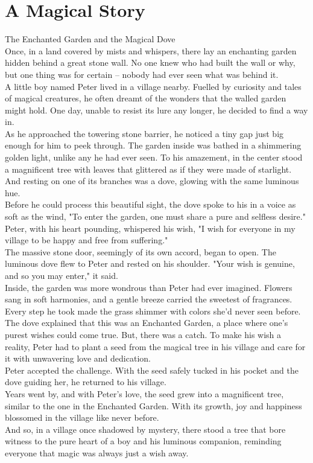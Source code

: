 \documentclass[a4paper,12pt]{article}
\begin{document}
\section{A Magical Story}
The Enchanted Garden and the Magical Dove\\
Once, in a land covered by mists and whispers, there lay an enchanting garden hidden behind a great stone wall. No one knew who had built the wall or why, but one thing was for certain – nobody had ever seen what was behind it.\\
A little boy named Peter lived in a village nearby. Fuelled by curiosity and tales of magical creatures, he often dreamt of the wonders that the walled garden might hold. One day, unable to resist its lure any longer, he decided to find a way in.\\
As he approached the towering stone barrier, he noticed a tiny gap just big enough for him to peek through. The garden inside was bathed in a shimmering golden light, unlike any he had ever seen. To his amazement, in the center stood a magnificent tree with leaves that glittered as if they were made of starlight. And resting on one of its branches was a dove, glowing with the same luminous hue.\\
Before he could process this beautiful sight, the dove spoke to his in a voice as soft as the wind, "To enter the garden, one must share a pure and selfless desire."\\
Peter, with his heart pounding, whispered his wish, "I wish for everyone in my village to be happy and free from suffering."\\
The massive stone door, seemingly of its own accord, began to open. The luminous dove flew to Peter and rested on his shoulder. "Your wish is genuine, and so you may enter," it said.\\
Inside, the garden was more wondrous than Peter had ever imagined. Flowers sang in soft harmonies, and a gentle breeze carried the sweetest of fragrances. Every step he took made the grass shimmer with colors she'd never seen before.\\
The dove explained that this was an Enchanted Garden, a place where one’s purest wishes could come true. But, there was a catch. To make his wish a reality, Peter had to plant a seed from the magical tree in his village and care for it with unwavering love and dedication.\\
Peter accepted the challenge. With the seed safely tucked in his pocket and the dove guiding her, he returned to his village.\\
Years went by, and with Peter's love, the seed grew into a magnificent tree, similar to the one in the Enchanted Garden. With its growth, joy and happiness blossomed in the village like never before.\\
And so, in a village once shadowed by mystery, there stood a tree that bore witness to the pure heart of a boy and his luminous companion, reminding everyone that magic was always just a wish away.\\
\end{document}
